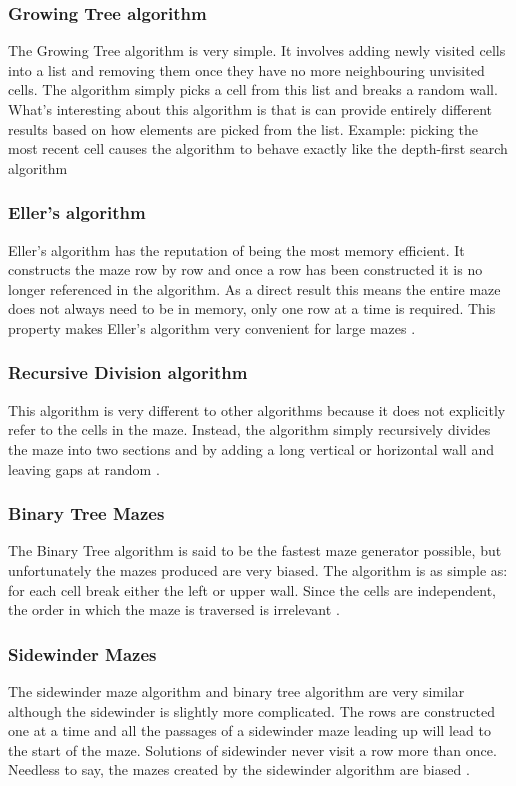 \subsubsection{Growing Tree algorithm}
The Growing Tree algorithm is very simple. It involves adding newly visited cells into a list and removing them once they have no more neighbouring unvisited cells. The algorithm simply picks a cell from this list and breaks a random wall. What's interesting about this algorithm is that is can provide entirely different results based on how elements are picked from the list. Example: picking the most recent cell causes the algorithm to behave exactly like the depth-first search algorithm \citep{ThinkLabyrinth}

\subsubsection{Eller's algorithm}
Eller's algorithm has the reputation of being the most memory efficient. It constructs the maze row by row and once a row has been constructed it is no longer referenced in the algorithm. As a direct result this means the entire maze does not always need to be in memory, only one row at a time is required. This property makes Eller's algorithm very convenient for large mazes \citep{ThinkLabyrinth}.

\subsubsection{Recursive Division algorithm}
This algorithm is very different to other algorithms because it does not explicitly refer to the cells in the maze. Instead, the algorithm simply recursively divides the maze into two sections and by adding a long vertical or horizontal wall and leaving gaps at random \citep{ThinkLabyrinth}.

\subsubsection{Binary Tree Mazes}
The Binary Tree algorithm is said to be the fastest maze generator possible, but unfortunately the mazes produced are very biased. The algorithm is as simple as: for each cell break either the left or upper wall. Since the cells are independent, the order in which the maze is traversed is irrelevant \citep{ThinkLabyrinth}.

\subsubsection{Sidewinder Mazes}
The sidewinder maze algorithm and binary tree algorithm are very similar although the sidewinder is slightly more complicated. The rows are constructed one at a time and all the passages of a sidewinder maze leading up will lead to the start of the maze. Solutions of sidewinder never visit a row more than once. Needless to say, the mazes created by the sidewinder algorithm are biased \citep{ThinkLabyrinth}.


